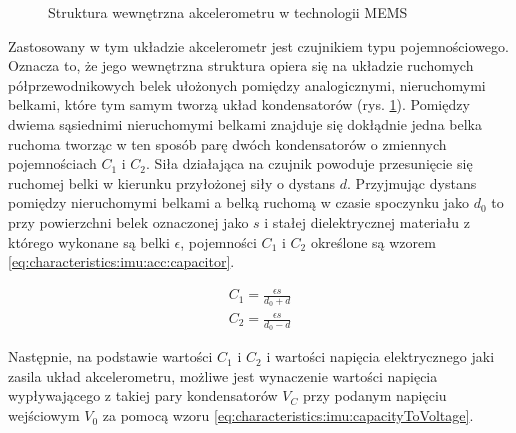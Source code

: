 	\begin{figure}[!htp]
				
		\caption{Struktura wewnętrzna akcelerometru w technologii MEMS}
		\label{fig:characteristics:imu:acc:mems}
	\end{figure}
		
	Zastosowany w tym układzie akcelerometr jest czujnikiem typu pojemnościowego. Oznacza to, że jego wewnętrzna struktura opiera się na układzie ruchomych półprzewodnikowych belek ułożonych pomiędzy analogicznymi, nieruchomymi belkami, które tym samym tworzą układ kondensatorów (rys. \ref{fig:characteristics:imu:acc:mems}). Pomiędzy dwiema sąsiednimi nieruchomymi belkami znajduje się dokłądnie jedna belka ruchoma tworząc w ten sposób parę dwóch kondensatorów o zmiennych pojemnościach $C_1$ i $C_2$. Siła działająca na czujnik powoduje przesunięcie się ruchomej belki w kierunku przyłożonej siły o dystans $d$. Przyjmując dystans pomiędzy nieruchomymi belkami a belką ruchomą w czasie spoczynku jako $d_0$ to przy powierzchni belek oznaczonej jako $s$ i stałej dielektrycznej materiału z którego wykonane są belki $\epsilon$, pojemności $C_1$ i $C_2$ określone są wzorem \eqref{eq:characteristics:imu:acc:capacitor}.
	
	\begin{subequations}
		\begin{align}
			C_1 = \frac{\epsilon s}{d_0 + d}\\ 
			C_2 = \frac{\epsilon s}{d_0 - d} 
			\label{eq:characteristics:imu:acc:capacitor}
		\end{align}
	\end{subequations}
	
	Następnie, na podstawie wartości $C_1$ i $C_2$ i wartości napięcia elektrycznego jaki zasila układ akcelerometru, możliwe jest wynaczenie wartości napięcia wypływającego z takiej pary kondensatorów $V_C$ przy podanym napięciu wejściowym $V_0$ za pomocą wzoru \eqref{eq:characteristics:imu:capacityToVoltage}.

